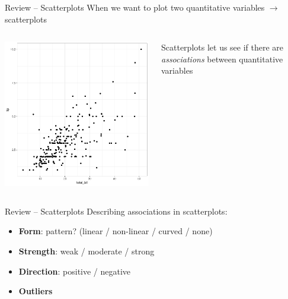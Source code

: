 \documentclass{beamer}
\begin{document}
\begin{frame}{Review -- Scatterplots}
When we want to plot two quantitative variables $\rightarrow$ scatterplots
\begin{columns}
  \begin{column}{0.5\textwidth}
  \includegraphics[scale=0.35]{img/scatter_tip.png}
  \end{column}
  \begin{column}{0.4\textwidth}
  Scatterplots let us see if there are \textit{associations} between quantitative variables
  \end{column}
\end{columns}
\end{frame}



\begin{frame}{Review -- Scatterplots}
Describing associations in scatterplots: \vspace{3mm}

\begin{itemize}
    \item \textbf{Form}: pattern? (linear / non-linear / curved / none)
    \item \textbf{Strength}: weak / moderate / strong
    \item \textbf{Direction}: positive / negative
    \item \textbf{Outliers}
\end{itemize}
\end{frame}
\end{document}
